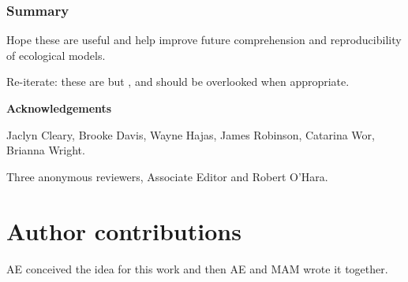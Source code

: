 
\begin{frame}
\frametitle{Summary}

Hope these are useful and help improve future comprehension and reproducibility
of ecological models.

\medskip

Re-iterate: these are  but , and should be overlooked when appropriate.

\bigskip

\medskip

{\bf Acknowledgements}

Jaclyn Cleary,
Brooke Davis,
Wayne Hajas,
James Robinson,
Catarina Wor,
Brianna Wright.

Three anonymous reviewers, Associate Editor and Robert O'Hara.

\end{frame}





\begin{frame}
\frametitle{}

\end{frame}



\begin{frame}
\frametitle{}

\end{frame}



\begin{frame}
\frametitle{}

\end{frame}




\section*{Author contributions} AE conceived the idea for this work
and then AE and MAM wrote it together.

